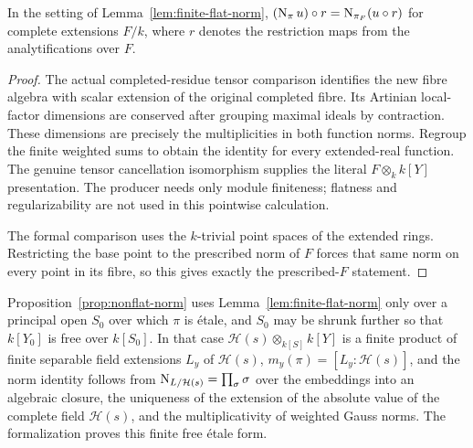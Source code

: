 \begin{lemma}\label{lem:finite-flat-norm-base-change}
\leanok
{}
In the setting of Lemma~\ref{lem:finite-flat-norm}, $(\operatorname{N}_\pi u)\circ r=\operatorname{N}_{\pi_F}(u\circ r)$ for complete
extensions $F/k$, where $r$ denotes the restriction maps from the analytifications over $F$.
\end{lemma}

\begin{proof}
The actual completed-residue tensor comparison identifies the new fibre algebra
with scalar extension of the original completed fibre. Its Artinian local-factor
dimensions are conserved after grouping maximal ideals by contraction. These
dimensions are precisely the multiplicities in both function norms. Regroup the
finite weighted sums to obtain the identity for every extended-real function.
The genuine tensor cancellation isomorphism supplies the literal
$F\otimes_k k[Y]$ presentation. The producer needs only module finiteness;
flatness and regularizability are not used in this pointwise calculation.

The formal comparison uses the $k$-trivial point spaces of the extended rings.
Restricting the base point to the prescribed norm of $F$ forces that same norm
on every point in its fibre, so this gives exactly the prescribed-$F$ statement.
\end{proof}

\begin{remark}\label{rmk:finite-flat-norm-etale}
Proposition~\ref{prop:nonflat-norm} uses Lemma~\ref{lem:finite-flat-norm} only over a principal open
$S_0$ over which $\pi$ is \'etale, and $S_0$ may be shrunk further so that $k[Y_0]$ is free over
$k[S_0]$. In that case $\mathcal H(s)\otimes_{k[S]}k[Y]$ is a finite product of finite separable field
extensions $L_y$ of $\mathcal H(s)$, $m_y(\pi)=[L_y:\mathcal H(s)]$, and the norm identity follows from
$\operatorname{N}_{L/\mathcal H(s)}=\prod_\sigma\sigma$ over the embeddings into an algebraic closure, the uniqueness of
the extension of the absolute value of the complete field $\mathcal H(s)$, and the multiplicativity of
weighted Gauss norms. The formalization proves this finite free \'etale form.
\end{remark}

